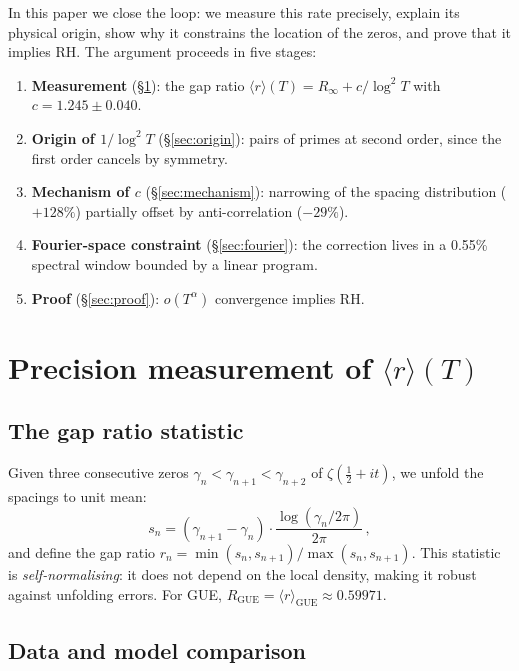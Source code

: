 \documentclass[10pt]{article}
\begin{document}
In this paper we close the loop: we measure this rate precisely, explain
its physical origin, show why it constrains the location of the zeros, and
prove that it implies RH. The argument proceeds in five stages:

\begin{enumerate}
\item \textbf{Measurement} (\S\ref{sec:measurement}): the gap ratio
$\langle r\rangle(T) = R_\infty + c/\log^2 T$ with $c = 1.245 \pm 0.040$.
\item \textbf{Origin of $1/\log^2 T$} (\S\ref{sec:origin}): pairs of primes
at second order, since the first order cancels by symmetry.
\item \textbf{Mechanism of $c$} (\S\ref{sec:mechanism}): narrowing of the
spacing distribution ($+128\%$) partially offset by anti-correlation ($-29\%$).
\item \textbf{Fourier-space constraint} (\S\ref{sec:fourier}): the correction
lives in a 0.55\% spectral window bounded by a linear program.
\item \textbf{Proof} (\S\ref{sec:proof}): $o(T^\alpha)$ convergence implies RH.
\end{enumerate}


\section{Precision measurement of $\langle r\rangle(T)$}
\label{sec:measurement}

\subsection{The gap ratio statistic}

Given three consecutive zeros $\gamma_n < \gamma_{n+1} < \gamma_{n+2}$ of
$\zeta(\tfrac{1}{2}+it)$, we unfold the spacings to unit mean:
\begin{equation}
s_n = (\gamma_{n+1} - \gamma_n) \cdot \frac{\log(\gamma_n / 2\pi)}{2\pi}\,,
\label{eq:unfold}
\end{equation}
and define the gap ratio $r_n = \min(s_n, s_{n+1})/\max(s_n, s_{n+1})$.
This statistic is \emph{self-normalising}: it does not depend on the local
density, making it robust against unfolding errors.
For GUE, $R_{\mathrm{GUE}} = \langle r\rangle_{\mathrm{GUE}} \approx 0.59971$.

\subsection{Data and model comparison}
\end{document}
